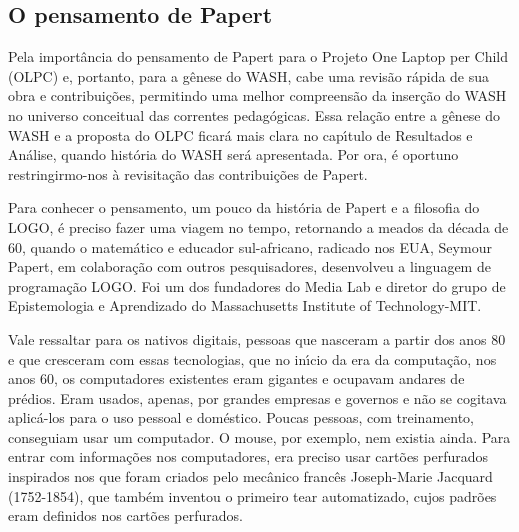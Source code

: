 \documentclass[
12pt,		%
openright,	%
twoside,  %
a4paper,			%
chapter=TITLE,		%
english,			%
french,				%
spanish,			%
brazil				%
]{USPSC-classe/USPSC}
\begin{document}
\subsection[O pensamento de Papert]{O pensamento de Papert}\label{O pensamento de Papert}
Pela import\^ancia do pensamento de Papert para o Projeto One Laptop per Child (OLPC) e, portanto, para a g\^enese do WASH, cabe uma revis\~ao r\'apida de sua obra e contribui\c{c}\~oes, permitindo uma melhor compreens\~ao da inser\c{c}\~ao do WASH no universo conceitual das correntes pedag\'ogicas. Essa rela\c{c}\~ao entre a g\^enese do WASH e a proposta do OLPC ficar\'a mais clara no cap\'{\i}tulo de Resultados e An\'alise, quando hist\'oria do WASH ser\'a apresentada. Por ora, \'e oportuno restringirmo-nos \`a revisita\c{c}\~ao das contribui\c{c}\~oes de Papert.










Para conhecer  o pensamento, um pouco da hist\'oria de Papert e  a filosofia do LOGO, \'e preciso fazer uma viagem no tempo, retornando a meados da d\'ecada de 60, quando o matem\'atico e educador sul-africano, radicado nos EUA, Seymour Papert, em colabora\c{c}\~ao com outros pesquisadores, desenvolveu a linguagem  de programa\c{c}\~ao LOGO.  Foi um dos fundadores do Media Lab e diretor do grupo de Epistemologia e Aprendizado do Massachusetts Institute of Technology-MIT.










Vale ressaltar para os nativos digitais, pessoas que nasceram a partir dos anos 80 e que cresceram com essas tecnologias, que no in\'{\i}cio da era da computa\c{c}\~ao, nos anos 60, os computadores existentes eram gigantes e ocupavam andares de pr\'edios. Eram usados, apenas, por grandes empresas e governos e n\~ao se cogitava aplic\'a-los para o uso pessoal e dom\'estico. Poucas pessoas, com treinamento, conseguiam usar um computador. O mouse, por exemplo, nem existia ainda. Para entrar com informa\c{c}\~oes nos computadores, era preciso usar cart\~oes perfurados inspirados nos que foram criados pelo mec\^anico franc\^es Joseph-Marie Jacquard (1752-1854), que tamb\'em inventou o primeiro tear automatizado, cujos padr\~oes eram definidos nos cart\~oes perfurados.
\end{document}
